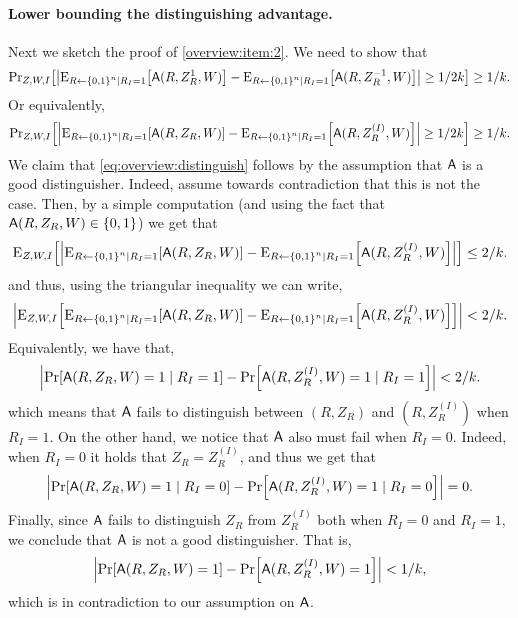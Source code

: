 \paragraph{Lower bounding the distinguishing advantage.} Next we sketch the proof of \cref{overview:item:2}. We need to show that 
\begin{align}
\ppr{Z,W,I}{ \size{\eex{R\gets \zn\mid R_I=1}{\Ac(R,Z^1_R,W)}-\eex{R\gets \zn\mid R_I=1}{\Ac(R,Z^{-1}_R,W)}} \ge 1/2k}\ge 1/k.
\end{align}
Or equivalently,
\begin{align}\label{eq:overview:distinguish}
\ppr{Z,W,I}{ \size{\eex{R\gets \zn\mid R_I=1}{\Ac(R,Z_R,W)}-\eex{R\gets \zn\mid R_I=1}{\Ac(R,Z^{(I)}_R,W)}} \ge 1/2k}\ge 1/k.
\end{align}
We claim that \cref{eq:overview:distinguish} follows by the assumption that $\mathsf{A}$ is a good distinguisher. Indeed, assume towards contradiction that this is not the case. Then, by a simple  computation (and using the fact that $\Ac(R,Z_R,W)\in \set{0,1}$)  we get that 
\begin{align*}
\eex{Z,W,I}{ \size{\eex{R\gets \zn\mid R_I=1}{\Ac(R,Z_R,W)}-\eex{R\gets \zn\mid R_I=1}{\Ac(R,Z^{(I)}_R,W)}} }\le 2/k.
\end{align*}
and thus, using the triangular inequality we can write,
\begin{align*}
\size{\eex{Z,W,I}{\eex{R\gets \zn\mid R_I=1}{\Ac(R,Z_R,W)}-\eex{R\gets \zn\mid R_I=1}{\Ac(R,Z^{(I)}_R,W)}} }< 2/k.
\end{align*}
Equivalently, we have that,
\begin{align*}
\size{\pr{\Ac(R,Z_R,W)=1\mid R_I=1}-\pr{\Ac(R,Z^{(I)}_R,W)=1\mid R_I=1}}<2/k.
\end{align*}
which means that $\mathsf{A}$ fails to distinguish between $(R,Z_R)$ and $(R,Z^{(I)}_R)$ when $R_I=1$. On the other hand, we notice that $\mathsf{A}$ also must fail when $R_I=0$. Indeed, when $R_I=0$ it holds that $Z_R=Z^{(I)}_R$, and thus we get  that 
\begin{align*}
\size{\pr{\Ac(R,Z_R,W)=1\mid R_I=0}-\pr{\Ac(R,Z^{(I)}_R,W)=1\mid R_I=0}}=0.
\end{align*}
Finally, since $\mathsf{A}$ fails to distinguish $Z_R$ from $Z^{(I)}_R$ both when $R_I=0$ and $R_I=1$, we conclude that $\mathsf{A}$ is not a good distinguisher. That is, 
\begin{align*}
\size{\pr{\Ac(R,Z_R,W)=1}-\pr{\Ac(R,Z^{(I)}_R,W)=1}}< 1/k,
\end{align*}
which is in contradiction to our assumption on $\mathsf{A}$.
